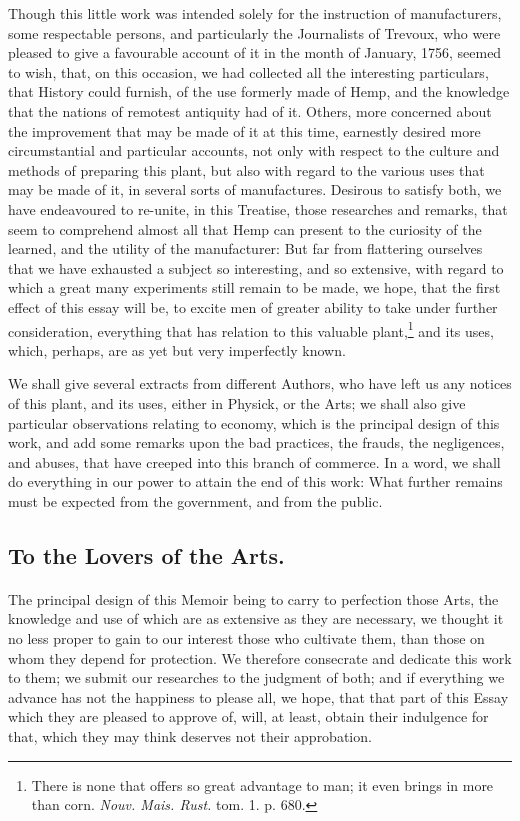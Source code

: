 \documentclass[a4paper, 11pt, oneside, polutonikogreek, english]{article}
\begin{document}
Though this little work was intended solely for the instruction of manufacturers, some respectable persons, and particularly the Journalists of Trevoux, who were pleased to give a favourable account of it in the month of January, 1756, seemed to wish, that, on this occasion, we had collected all the interesting particulars, that History could furnish, of the use formerly made of Hemp, and the knowledge that the nations of remotest antiquity had of it. Others, more concerned about the improvement that may be made of it at this time, earnestly desired more circumstantial and particular accounts, not only with respect to the culture and methods of preparing this plant, but also with regard to the various uses that may be made of it, in several sorts of manufactures. Desirous to satisfy both, we have endeavoured to re-unite, in this Treatise, those researches and remarks, that seem to comprehend almost all that Hemp can present to the curiosity of the learned, and the utility of the manufacturer: But far from flattering ourselves that we have exhausted a subject so interesting, and so extensive, with regard to which a great many experiments still remain to be made, we hope, that the first effect of this essay will be, to excite men of greater ability to take under further consideration, everything that has relation to this valuable plant,\footnote{There is none that offers so great advantage to man; it even brings in more than corn. \emph{Nouv. Mais. Rust.} tom. 1. p. 680.} and its uses, which, perhaps, are as yet but very imperfectly known.

We shall give several extracts from different Authors, who have left us any notices of this plant, and its uses, either in Physick, or the Arts; we shall also give particular observations relating to economy, which is the principal design of this work, and add some remarks upon the bad practices, the frauds, the negligences, and abuses, that have creeped into this branch of commerce. In a word, we shall do everything in our power to attain the end of this work: What further remains must be expected from the government, and from the public.

\subsection*{To the Lovers of the Arts.}
\paragraph{}
The principal design of this Memoir being to carry to perfection those Arts, the knowledge and use of which are as extensive as they are necessary, we thought it no less proper to gain to our interest those who cultivate them, than those on whom they depend for protection. We therefore consecrate and dedicate this work to them; we submit our researches to the judgment of both; and if everything we advance has not the happiness to please all, we hope, that that part of this Essay which they are pleased to approve of, will, at least, obtain their indulgence for that, which they may think deserves not their approbation.
\clearpage
\end{document}

